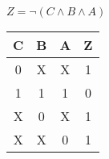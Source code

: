 
\begin{center}
    {\(Z = \lnot (C \land B \land A) \)}
    \begin{table}[h] %
        \begin{center}
            \begin{tabular}{|c|c|c||c|} \hline
            C & B & A & Z \\ \hline\hline
            0 & X & X & 1 \\ \hline
            1 & 1 & 1 & 0 \\ \hline
            X & 0 & X & 1 \\ \hline
            X & X & 0 & 1 \\ \hline
            \end{tabular}
        \end{center}
    \end{table}
\end{center}
